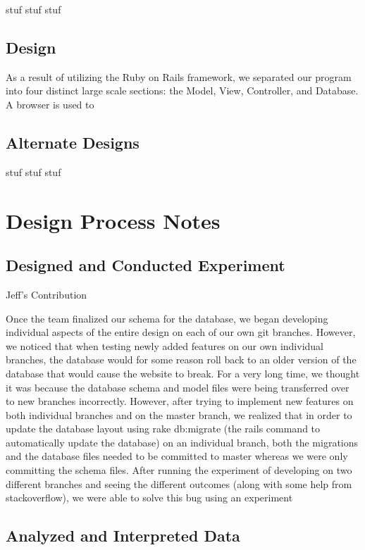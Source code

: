 \documentclass[11pt]{article}
\begin{document}
stuf stuf stuf

\subsection{Design}

As a result of utilizing the Ruby on Rails framework, we separated our program into four distinct large scale sections: the Model, View, Controller, and Database.  A browser is used to 

\subsection{Alternate Designs}

stuf stuf stuf

\section{Design Process Notes}

\subsection{Designed and Conducted Experiment}

Jeff's Contribution

Once the team finalized our schema for the database, we began developing individual aspects of the entire design on each of our own git branches.  However, we noticed that when testing newly added features on our own individual branches, the database would for some reason roll back to an older version of the database that would cause the website to break.  For a very long time, we thought it was because the database schema and model files were being transferred over to new branches incorrectly.  However, after trying to implement new features on both individual branches and on the master branch, we realized that in order to update the database layout using rake db:migrate (the rails command to automatically update the database) on an individual branch, both the migrations and the database files needed to be committed to master whereas we were only committing the schema files.  After running the experiment of developing on two different branches and seeing the different outcomes (along with some help from stackoverflow), we were able to solve this bug using an experiment

\subsection{Analyzed and Interpreted Data}
\end{document}
